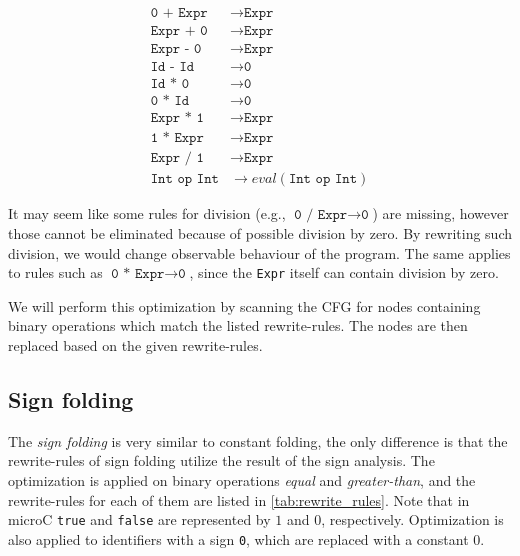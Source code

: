 \documentclass[thesis=M,english]{FITthesis}[2019/12/23]
\begin{document}
\begin{align*}
    \texttt{0 + Expr} &\longrightarrow \texttt{Expr}\\
    \texttt{Expr + 0} &\longrightarrow \texttt{Expr}\\
    \texttt{Expr - 0} &\longrightarrow \texttt{Expr}\\
    \texttt{Id - Id} &\longrightarrow \texttt{0}\\
    \texttt{Id * 0} &\longrightarrow \texttt{0}\\
    \texttt{0 * Id} &\longrightarrow \texttt{0}\\
    \texttt{Expr * 1} &\longrightarrow \texttt{Expr}\\
    \texttt{1 * Expr} &\longrightarrow \texttt{Expr}\\
    \texttt{Expr / 1} &\longrightarrow \texttt{Expr}\\
    \texttt{Int op Int} &\longrightarrow \texttt{$eval(\texttt{Int op Int})$}
\end{align*}

It may seem like some rules for division (e.g., $\texttt{0 / Expr} \longrightarrow \texttt{0}$) are missing, however those cannot be eliminated because of possible division by zero. By rewriting such division, we would change observable behaviour of the program. The same applies to rules such as $\texttt{0 * Expr} \longrightarrow \texttt{0}$, since the \texttt{Expr} itself can contain division by zero.

We will perform this optimization by scanning the CFG for nodes containing binary operations which match the listed rewrite-rules. The nodes are then replaced based on the given rewrite-rules.

\subsection{Sign folding}
The \emph{sign folding} is very similar to constant folding, the only difference is that the rewrite-rules of sign folding utilize the result of the sign analysis. The optimization is applied on binary operations \emph{equal} and \emph{greater-than}, and the rewrite-rules for each of them are listed in \autoref{tab:rewrite_rules}. Note that in microC \texttt{true} and \texttt{false} are represented by $1$ and $0$, respectively. Optimization is also applied to identifiers with a sign \texttt{0}, which are replaced with a constant $0$.
\end{document}
